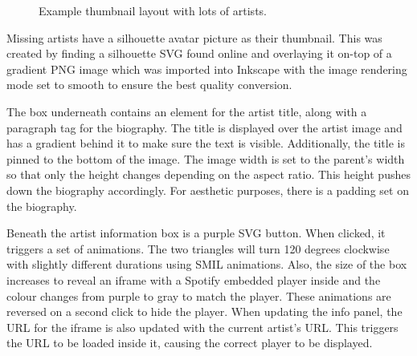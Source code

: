 \documentclass[10pt]{article}
\begin{document}
                \begin{figure}[!ht]
                  \centering
                  \caption{Example thumbnail layout with lots of artists.}
                \end{figure}


                Missing artists have a silhouette avatar picture as their thumbnail. This was created by finding a silhouette SVG found online and overlaying it on-top of a gradient PNG image which was imported into Inkscape with the image rendering mode set to smooth to ensure the best quality conversion. 

                The box underneath contains an element for the artist title, along with a paragraph tag for the biography. The title is displayed over the artist image and has a gradient behind it to make sure the text is visible. Additionally, the title is pinned to the bottom of the image. The image width is set to the parent's width so that only the height changes depending on the aspect ratio. This height pushes down the biography accordingly. For aesthetic purposes, there is a padding set on the biography.

                Beneath the artist information box is a purple SVG button. When clicked, it triggers a set of animations. The two triangles will turn 120 degrees clockwise with slightly different durations using SMIL animations. Also, the size of the box increases to reveal an iframe with a Spotify embedded player inside and the colour changes from purple to gray to match the player. These animations are reversed on a second click to hide the player. When updating the info panel, the URL for the iframe is also updated with the current artist's URL. This triggers the URL to be loaded inside it, causing the correct player to be displayed.
\end{document}

